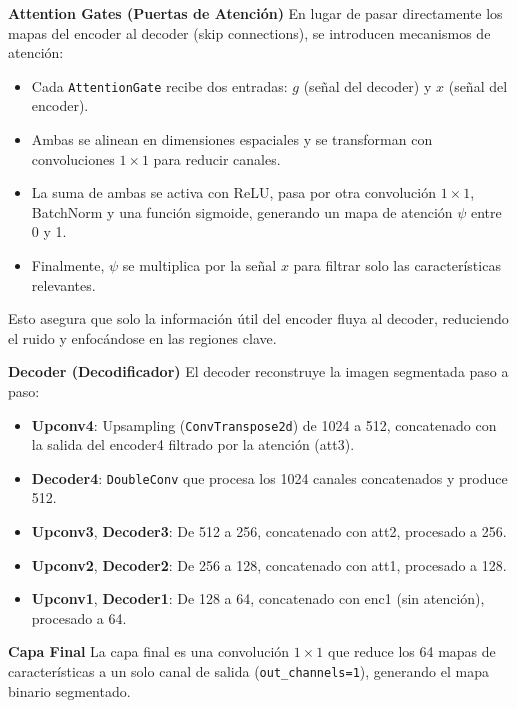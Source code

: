 \textbf{Attention Gates (Puertas de Atención)}
En lugar de pasar directamente los mapas del encoder al decoder (skip connections), se introducen mecanismos de atención:
\begin{itemize}
    \item Cada \texttt{AttentionGate} recibe dos entradas: $g$ (señal del decoder) y $x$ (señal del encoder).
    \item Ambas se alinean en dimensiones espaciales y se transforman con convoluciones $1\times1$ para reducir canales.
    \item La suma de ambas se activa con ReLU, pasa por otra convolución $1\times1$, BatchNorm y una función sigmoide, generando un mapa de atención $\psi$ entre 0 y 1.
    \item Finalmente, $\psi$ se multiplica por la señal $x$ para filtrar solo las características relevantes.
\end{itemize}
Esto asegura que solo la información útil del encoder fluya al decoder, reduciendo el ruido y enfocándose en las regiones clave.

\textbf{Decoder (Decodificador)}
El decoder reconstruye la imagen segmentada paso a paso:
\begin{itemize}
    \item \textbf{Upconv4}: Upsampling (\texttt{ConvTranspose2d}) de 1024 a 512, concatenado con la salida del encoder4 filtrado por la atención (att3).
    \item \textbf{Decoder4}: \texttt{DoubleConv} que procesa los 1024 canales concatenados y produce 512.
    \item \textbf{Upconv3}, \textbf{Decoder3}: De 512 a 256, concatenado con att2, procesado a 256.
    \item \textbf{Upconv2}, \textbf{Decoder2}: De 256 a 128, concatenado con att1, procesado a 128.
    \item \textbf{Upconv1}, \textbf{Decoder1}: De 128 a 64, concatenado con enc1 (sin atención), procesado a 64.
\end{itemize}

\textbf{Capa Final}
La capa final es una convolución $1\times1$ que reduce los 64 mapas de características a un solo canal de salida (\texttt{out\_channels=1}), generando el mapa binario segmentado.

